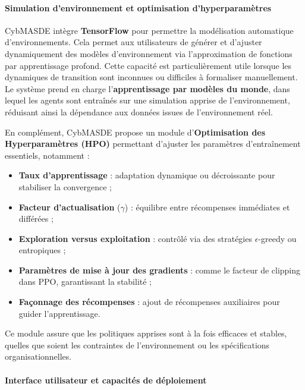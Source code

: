 \paragraph{Simulation d'environnement et optimisation d'hyperparamètres}

CybMASDE intègre \textbf{TensorFlow} pour permettre la modélisation automatique d'environnements. Cela permet aux utilisateurs de générer et d'ajuster dynamiquement des modèles d'environnement via l'approximation de fonctions par apprentissage profond. Cette capacité est particulièrement utile lorsque les dynamiques de transition sont inconnues ou difficiles à formaliser manuellement. Le système prend en charge l'\textbf{apprentissage par modèles du monde}, dans lequel les agents sont entraînés sur une simulation apprise de l'environnement, réduisant ainsi la dépendance aux données issues de l'environnement réel.

En complément, CybMASDE propose un module d'\textbf{Optimisation des Hyperparamètres (HPO)} permettant d'ajuster les paramètres d'entraînement essentiels, notamment :

\begin{itemize}
    \item \textbf{Taux d'apprentissage} : adaptation dynamique ou décroissante pour stabiliser la convergence ;
    \item \textbf{Facteur d'actualisation} ($\gamma$) : équilibre entre récompenses immédiates et différées ;
    \item \textbf{Exploration versus exploitation} : contrôlé via des stratégies $\epsilon$-greedy ou entropiques ;
    \item \textbf{Paramètres de mise à jour des gradients} : comme le facteur de clipping dans PPO, garantissant la stabilité ;
    \item \textbf{Façonnage des récompenses} : ajout de récompenses auxiliaires pour guider l'apprentissage.
\end{itemize}

Ce module assure que les politiques apprises sont à la fois efficaces et stables, quelles que soient les contraintes de l'environnement ou les spécifications organisationnelles.

\paragraph{Interface utilisateur et capacités de déploiement}


